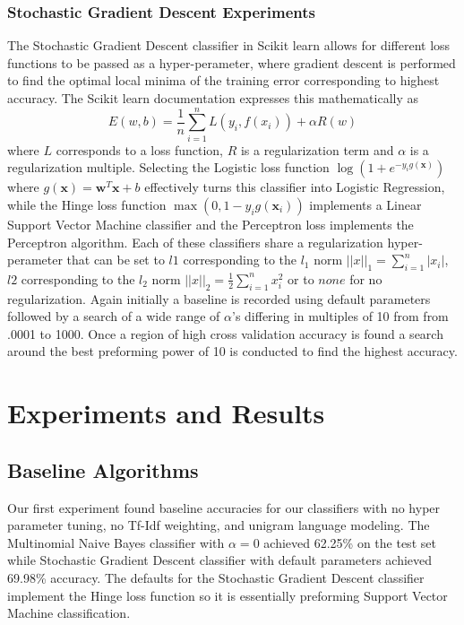 \documentclass[a4paper, 12pt]{article}
\begin{document}
\subsubsection{Stochastic Gradient Descent Experiments}
The Stochastic Gradient Descent classifier in Scikit learn allows for different loss functions to be passed as a hyper-perameter, where gradient descent is performed to find the optimal local minima of the training error corresponding to highest accuracy. The Scikit learn documentation \cite{pedregosa2011scikit} expresses this mathematically as 
\[E(w,b)=\frac{1}{n}\sum_{i=1}^{n}L(y_i,f(x_i))+\alpha R(w)\]
where $L$ corresponds to a loss function, $R$ is a regularization term and $\alpha$ is a regularization multiple. Selecting the Logistic loss function $\log(1+e^{-y_ig(\bm{x})})$ where $g(\bm{x})=\bm{w}^T\bm{x}+b$ effectively turns this classifier into Logistic Regression, while the Hinge loss function  $\max(0, 1 - y_ig(\bm{x}_i))$ implements a Linear Support Vector Machine classifier and the Perceptron loss implements the Perceptron algorithm.  Each of these classifiers share a regularization hyper-perameter that can be set to $l1$ corresponding to the $l_1$ norm $||x||_1=\sum_{i=1}^n |x_i|$, $l2$ corresponding to the $l_2$ norm $||x||_2= \frac{1}{2} \sum_{i=1}^{n} x_i^2$ or to $none$ for no regularization. Again initially a baseline is recorded using default parameters followed by a search of a  wide range of $\alpha$'s differing in multiples of 10 from from .0001 to 1000. Once a region of high cross validation accuracy is found a search around the best preforming power of 10 is conducted to find the highest accuracy.

\noindent
\section{Experiments and Results}
\subsection{Baseline Algorithms}
Our first experiment found baseline accuracies for our classifiers with no hyper parameter tuning, no Tf-Idf weighting, and unigram language modeling. The Multinomial Naive Bayes classifier with $\alpha=0$ achieved  62.25\% on the test set while Stochastic Gradient Descent classifier with default parameters achieved 69.98\% accuracy. The defaults for the Stochastic Gradient Descent classifier implement the Hinge loss function so it is essentially preforming Support Vector Machine classification.
\end{document}
